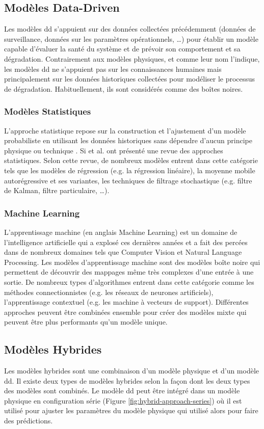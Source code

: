 \subsection{Modèles Data-Driven}
Les modèles \acrlong{dd} s'appuient sur des données collectées précédemment (données de surveillance, données sur les paramètres opérationnels, …) pour établir un modèle capable d'évaluer la santé du système et de prévoir son comportement et sa dégradation. Contrairement aux modèles physiques, et comme leur nom l'indique, les modèles \acrlong{dd} ne s'appuient pas sur les connaissances humaines mais principalement sur les données historiques collectées pour modéliser le processus de dégradation. Habituellement, ils sont considérés comme des boîtes noires.

\subsubsection{Modèles Statistiques}
L'approche statistique repose sur la construction et l'ajustement d'un modèle probabiliste en utilisant les données historiques sans dépendre d'aucun principe physique ou technique \cite{Si2011}. 
Si et al. \cite{Si2011} ont présenté une revue des approches statistiques. Selon cette revue, de nombreux modèles entrent dans cette catégorie tels que les modèles de régression (e.g. la régression linéaire), la moyenne mobile autorégressive et ses variantes, les techniques de filtrage stochastique (e.g. filtre de Kalman, filtre particulaire, …).

\subsubsection{Machine Learning}
L'apprentissage machine (en anglais Machine Learning) est un domaine de l'intelligence artificielle qui a explosé ces dernières années et a fait des percées dans de nombreux domaines tels que Computer Vision et Natural Language Processing. Les modèles d'apprentissage machine sont des modèles boîte noire qui permettent de découvrir des mappages même très complexes d'une entrée à une sortie. De nombreux types d'algorithmes entrent dans cette catégorie comme les méthodes connectionnistes (e.g. les réseaux de neurones artificiels), l'apprentissage contextuel (e.g. les machine à vecteurs de support). Différentes approches peuvent être combinées ensemble pour créer des modèles mixte qui peuvent être plus performants qu'un modèle unique.

\subsection{Modèles Hybrides}
Les modèles hybrides sont une combinaison d'un modèle physique et d'un modèle \acrlong{dd}. Il existe deux types de modèles hybrides selon la façon dont les deux types des modèles sont combinés. Le modèle \acrlong{dd} peut être intégré dans un modèle physique en configuration série (Figure \ref{fig:hybrid-approach-series}) où il est utilisé pour ajuster les paramètres du modèle physique qui utilisé alors pour faire des prédictions.

